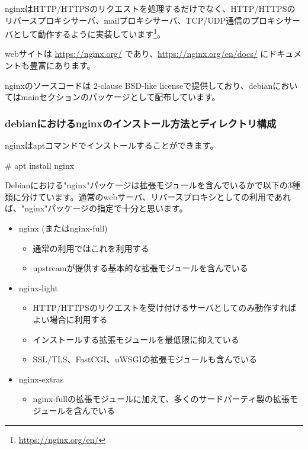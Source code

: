 \documentclass[mingoth,a4paper]{jsarticle}
\begin{document}
nginxはHTTP/HTTPSのリクエストを処理するだけでなく、HTTP/HTTPSのリバースプロキシサーバ、mailプロキシサーバ、TCP/UDP通信のプロキシサーバとして動作するように実装しています\footnote{\url{https://nginx.org/en/}}。

webサイトは \url{https://nginx.org/} であり、\url{https://nginx.org/en/docs/} にドキュメントも豊富にあります。

nginxのソースコードは 2-clause BSD-like licenseで提供しており、debianにおいてはmainセクションのパッケージとして配布しています。

\subsubsection{debianにおけるnginxのインストール方法とディレクトリ構成}

nginxはaptコマンドでインストールすることができます。

\begin{commandline}
# apt install nginx
\end{commandline}

Debianにおける"nginx"パッケージは拡張モジュールを含んでいるかで以下の3種類に分けています。通常のwebサーバ、リバースプロキシとしての利用であれば、"nginx"パッケージの指定で十分と思います。

\begin{itemize}
\item nginx (またはnginx-full)
  \begin{itemize}
  \item 通常の利用ではこれを利用する
  \item upstreamが提供する基本的な拡張モジュールを含んでいる
  \end{itemize}
\item nginx-light
  \begin{itemize}
  \item HTTP/HTTPSのリクエストを受け付けるサーバとしてのみ動作すればよい場合に利用する
  \item インストールする拡張モジュールを最低限に抑えている
  \item SSL/TLS、FastCGI、uWSGIの拡張モジュールも含んでいる
  \end{itemize}
\item nginx-extras
  \begin{itemize}
  \item nginx-fullの拡張モジュールに加えて、多くのサードパーティ製の拡張モジュールを含んでいる
  \end{itemize}
\end{itemize}
\end{document}
